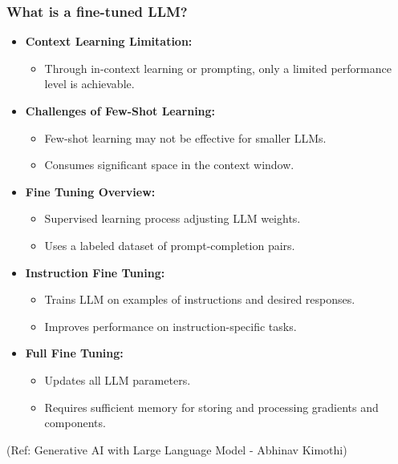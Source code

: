 \begin{frame}[fragile]\frametitle{What is a fine-tuned LLM?}

\begin{itemize}
  \item \textbf{Context Learning Limitation:}
    \begin{itemize}
      \item Through in-context learning or prompting, only a limited performance level is achievable.
    \end{itemize}

  \item \textbf{Challenges of Few-Shot Learning:}
    \begin{itemize}
      \item Few-shot learning may not be effective for smaller LLMs.
      \item Consumes significant space in the context window.
    \end{itemize}

  \item \textbf{Fine Tuning Overview:}
    \begin{itemize}
      \item Supervised learning process adjusting LLM weights.
      \item Uses a labeled dataset of prompt-completion pairs.
    \end{itemize}

  \item \textbf{Instruction Fine Tuning:}
    \begin{itemize}
      \item Trains LLM on examples of instructions and desired responses.
      \item Improves performance on instruction-specific tasks.
    \end{itemize}

  \item \textbf{Full Fine Tuning:}
    \begin{itemize}
      \item Updates all LLM parameters.
      \item Requires sufficient memory for storing and processing gradients and components.
    \end{itemize}
\end{itemize}


{\tiny (Ref: Generative AI with Large Language Model - Abhinav  Kimothi)}

\end{frame}


